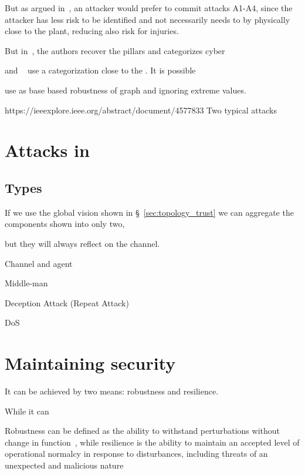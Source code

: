 \documentclass[../main.tex]{subfiles}
\begin{document}
But as argued in~\cite{CardenasEtAl2008}, an attacker would prefer to commit attacks A1-A4, since the attacker has less risk to be identified and not necessarily needs to by physically close to the plant, reducing also risk for injuries.


But in~\cite{TeixeiraEtAl2015}, the authors recover the \CIA{} pillars and categorizes cyber

\cite{DibajiEtAl2019} and ~ use a categorization close to the \CIA{}. It is possible

use as base
\cite{MaestreEtAl2018}
\cite{DibajiIshii2015,WangIshii2019,VelardeEtAl2018} based robustness of graph and ignoring extreme values.

https://ieeexplore.ieee.org/abstract/document/4577833
\cite{CaiEtAl2019,ZhangEtAl2021b}
Two typical attacks \cite{ZhangEtAl2021a}

\section{Attacks in \dmpc{}}\label{sec:attacks_in_dmpc}

\subsection{Types}\label{sec:types_of_attacks}
If we use the global vision shown in \S~\ref{sec:topology_trust} we can aggregate the components shown into only two,
\cite{PasqualettiEtAl2013}
\cite{BoemEtAl2020}

but they will always reflect on the channel.


Channel and agent

Middle-man

Deception Attack (Repeat Attack)

DoS

\cite{GuEtAl2016}

\section{Maintaining security}\label{sec:maintaining_security}
It can be achieved by two means: robustness and resilience.

While it can

Robustness can be defined as the ability to withstand perturbations without change in function~\cite{Jen2003}, while resilience
  is the ability to maintain an accepted level of operational normalcy  in  response  to  disturbances,  including  threats  of  an unexpected and malicious nature\cite{Rieger2010}
\end{document}
